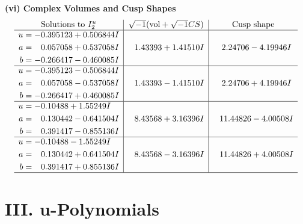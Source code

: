 \documentclass[1p]{elsarticle_modified}
\theoremstyle{definition}
\newcommand{\I}{\sqrt{-1}}
\begin{document}
\newpage\flushleft \textbf{(vi) Complex Volumes and Cusp Shapes}
$$\begin{array}{c|c|c}  
\text{Solutions to }I^u_{2}& \I (\text{vol} + \sqrt{-1}CS) & \text{Cusp shape}\\
 \hline 
\begin{aligned}
u &= -0.395123 + 0.506844 I \\
a &= \phantom{-}0.057058 + 0.537058 I \\
b &= -0.266417 - 0.460085 I\end{aligned}
 & \phantom{-}1.43393 + 1.41510 I & \phantom{-}2.24706 - 4.19946 I \\ \hline\begin{aligned}
u &= -0.395123 - 0.506844 I \\
a &= \phantom{-}0.057058 - 0.537058 I \\
b &= -0.266417 + 0.460085 I\end{aligned}
 & \phantom{-}1.43393 - 1.41510 I & \phantom{-}2.24706 + 4.19946 I \\ \hline\begin{aligned}
u &= -0.10488 + 1.55249 I \\
a &= \phantom{-}0.130442 - 0.641504 I \\
b &= \phantom{-}0.391417 - 0.855136 I\end{aligned}
 & \phantom{-}8.43568 + 3.16396 I & \phantom{-}11.44826 - 4.00508 I \\ \hline\begin{aligned}
u &= -0.10488 - 1.55249 I \\
a &= \phantom{-}0.130442 + 0.641504 I \\
b &= \phantom{-}0.391417 + 0.855136 I\end{aligned}
 & \phantom{-}8.43568 - 3.16396 I & \phantom{-}11.44826 + 4.00508 I\\
 \hline 
 \end{array}$$\newpage
\newpage\renewcommand{\arraystretch}{1}
\centering \section*{ III. u-Polynomials}
\end{document}
